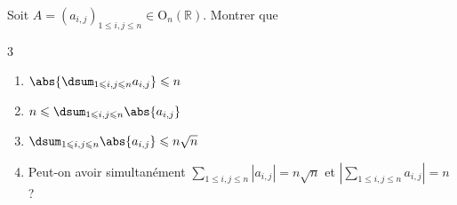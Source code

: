Soit $A=(a_{i,j})_{1\leqslant i,j \leqslant n} \in \mathrm O_n(\mathbb{R})$. Montrer que
\setlength{\columnsep}{-0.8cm}
\begin{multicols}{3}
\begin{enumerate}
  \item $\abs{\dsum_{1\leqslant i,j\leqslant n} a_{i,j}} \leqslant n$
  \item $n \leqslant \dsum_{1\leqslant i,j\leqslant n} \abs{a_{i,j}} $
  \item $ \dsum_{1\leqslant i,j\leqslant n} \abs{a_{i,j}}  \leqslant n\sqrt{n}$
\end{enumerate}
\end{multicols}
\begin{enumerate}\setcounter{enumi}{3}
 \item Peut-on avoir simultanément $\sum_{1 \leqslant i, j \leqslant n}\left|a_{i, j}\right|=n \sqrt{n}$ et $\left|\sum_{1 \leqslant i, j \leqslant n} a_{i, j}\right|=n$ ?
\end{enumerate}
